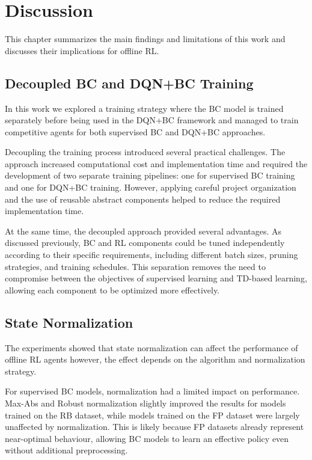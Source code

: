 \cleardoubleoddpage
\chapter{Discussion}
\label{app:discussion}

This chapter summarizes the main findings and limitations of this work and discusses their implications for offline RL.


\section{Decoupled BC and DQN+BC Training}
In this work we explored a training strategy where the BC model is trained separately before being used in the DQN+BC framework and managed to train competitive agents for both supervised BC and DQN+BC approaches.

Decoupling the training process introduced several practical challenges. The approach increased computational cost and implementation time and required the development of two separate training pipelines: one for supervised BC training and one for DQN+BC training. However, applying careful project organization and the use of reusable abstract components helped to reduce the required implementation time.

At the same time, the decoupled approach provided several advantages. As discussed previously, BC and RL components could be tuned independently according to their specific requirements, including different batch sizes, pruning strategies, and training schedules. This separation removes the need to compromise between the objectives of supervised learning and TD-based learning, allowing each component to be optimized more effectively.



\section{State Normalization}
The experiments showed that state normalization can affect the performance of offline RL agents however, the effect depends on the algorithm and normalization strategy.

For supervised BC models, normalization had a limited impact on performance. Max-Abs and Robust normalization slightly improved the results for models trained on the RB dataset, while models trained on the FP dataset were largely unaffected by normalization. This is likely because FP datasets already represent near-optimal behaviour, allowing BC models to learn an effective policy even without additional preprocessing.

